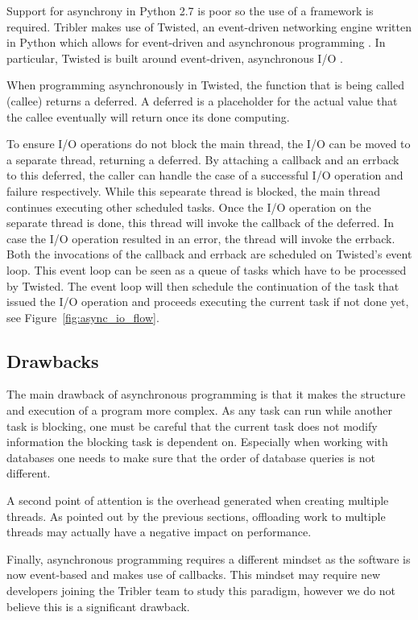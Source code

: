 Support for asynchrony in Python 2.7 is poor so the use of a framework is required.
Tribler makes use of Twisted, an event-driven networking engine written in Python which allows for event-driven and asynchronous programming \cite{kinder2005event}.
In particular, Twisted is built around event-driven, asynchronous I/O \cite{lefkowitz2003network}.

When programming asynchronously in Twisted, the function that is being called (callee) returns a deferred.
A deferred is a placeholder for the actual value that the callee eventually will return once its done computing.

To ensure I/O operations do not block the main thread, the I/O can be moved to a separate thread, returning a deferred.
By attaching a callback and an errback to this deferred, the caller can handle the case of a successful I/O operation and failure respectively.
While this sepearate thread is blocked, the main thread continues executing other scheduled tasks.
Once the I/O operation on the separate thread is done, this thread will invoke the callback of the deferred.
In case the I/O operation resulted in an error, the thread will invoke the errback.
Both the invocations of the callback and errback are scheduled on Twisted's event loop.
This event loop can be seen as a queue of tasks which have to be processed by Twisted.
The event loop will then schedule the continuation of the task that issued the I/O operation and proceeds executing the current task if not done yet, see Figure~\ref{fig:async_io_flow}.

\subsection{Drawbacks}

The main drawback of asynchronous programming is that it makes the structure and execution of a program more complex.
As any task can run while another task is blocking, one must be careful that the current task does not modify information the blocking task is dependent on.
Especially when working with databases one needs to make sure that the order of database queries is not different.

A second point of attention is the overhead generated when creating multiple threads.
As pointed out by the previous sections, offloading work to multiple threads may actually have a negative impact on performance.

Finally, asynchronous programming requires a different mindset as the software is now event-based and makes use of callbacks.
This mindset may require new developers joining the Tribler team to study this paradigm, however we do not believe this is a significant drawback.

